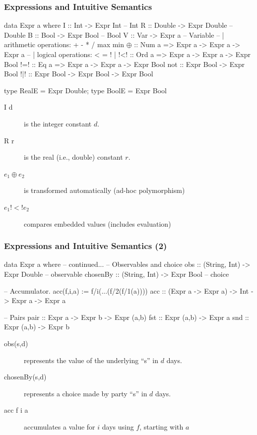 \documentclass[xcolor=dvipsnames,11pt]{beamer}
\begin{document}
\begin{frame}[fragile,t]
    \frametitle{Expressions and Intuitive Semantics}

\begin{hscode}
data Expr a where
    I :: Int    -> Expr Int    -- Int
    R :: Double -> Expr Double -- Double
    B :: Bool   -> Expr Bool   -- Bool
    V :: Var    -> Expr a      -- Variable
-- | arithmetic operations: + - * / max min
$\oplus$ :: Num a => Expr a -> Expr a -> Expr a
-- | logical operations: < = ! |
!<! :: Ord a => Expr a -> Expr a -> Expr Bool
!=! :: Eq a  => Expr a -> Expr a -> Expr Bool
not :: Expr Bool -> Expr Bool
!|! :: Expr Bool -> Expr Bool -> Expr Bool

type RealE = Expr Double; type BoolE = Expr Bool
\end{hscode}

\begin{description}
\item[I d] is the integer constant $d$.
\item[R r] is the real (i.e., double) constant $r$.
\item[$e_1 \oplus e_2$] is transformed automatically (ad-hoc polymorphism)
\item[$e_1 !\!\!<! e_2$] compares embedded values (includes evaluation)
\end{description}

\end{frame}

\begin{frame}[fragile,t]
    \frametitle{Expressions and Intuitive Semantics (2)}

\begin{hscode}
data Expr a where
    -- continued...
    -- Observables and choice
    obs :: (String, Int) -> Expr Double    -- observable
    chosenBy :: (String, Int) -> Expr Bool -- choice

    -- Accumulator. acc(f,i,a) := f/i(...(f/2(f/1(a))))
    acc :: (Expr a -> Expr a) -> Int -> Expr a -> Expr a

    -- Pairs
    pair :: Expr a -> Expr b -> Expr (a,b)
    fst :: Expr (a,b) -> Expr a
    snd :: Expr (a,b) -> Expr b
\end{hscode}

\begin{description}
\item[obs(s,d)] represents the value of the underlying ``s'' in $d$ days.
\item[chosenBy(s,d)] represents a choice made by party ``s'' in $d$ days.
\item[acc f i a] accumulates a value for $i$ days using $f$, starting with $a$
\end{description}

\end{frame}
\end{document}
